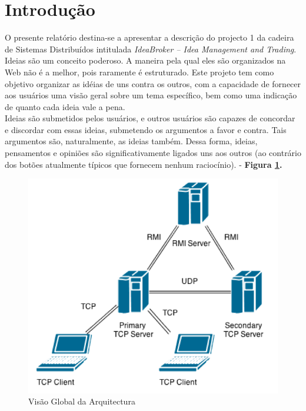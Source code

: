\documentclass[12pt]{article} %
\begin{document}
\newpage %


\section{Introdução} %
\label{sec:intro}
O presente relatório destina-se a apresentar a descrição do projecto 1 da cadeira de Sistemas Distribuídos intitulada \emph{IdeaBroker – Idea Management and Trading}.\\

Ideias são um conceito poderoso. A maneira pela qual eles são organizados na Web não é a melhor, pois raramente é estruturado. Este projeto tem como objetivo organizar as idéias de uns contra os outros, com a capacidade de fornecer aos usuários uma visão geral sobre um tema específico, bem como uma indicação de quanto cada ideia vale a pena.\\

Ideias são submetidos pelos usuários, e outros usuários são capazes de concordar e discordar com essas ideias, submetendo os argumentos a favor e contra. Tais argumentos são, naturalmente, as ideias também. Dessa forma, ideias, pensamentos e opiniões são significativamente ligados uns aos outros (ao contrário dos botões atualmente típicos que fornecem nenhum raciocínio). - \textbf{Figura \ref{figure1}.}

\begin{figure}[!ht]
  	\centering
  	\includegraphics[scale=0.5]{figure1.png}
  	\caption{Visão Global da Arquitectura}
	\label{figure1}
\end{figure}
\end{document}
